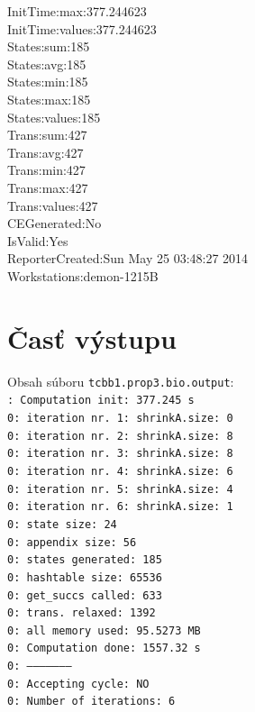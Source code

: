 \documentclass[11pt,final,oneside]{fithesis}
\begin{document}
{InitTime:max:377.244623\\
InitTime:values:377.244623\\
States:sum:185\\
States:avg:185\\
States:min:185\\
States:max:185\\
States:values:185\\
Trans:sum:427\\
Trans:avg:427\\
Trans:min:427\\
Trans:max:427\\
Trans:values:427\\
CEGenerated:No\\
IsValid:Yes\\
ReporterCreated:Sun May 25 03:48:27 2014\\
Workstations:demon-1215B\\
}


\section{\v Cas\v t v\'ystupu}
\label{sec:prop3output}
Obsah s\'uboru {\tt tcbb1.prop3.bio.output}:\\

{\tt{}: Computation init:  377.245 s\\
0: iteration nr. 1: shrinkA.size: 0\\
0: iteration nr. 2: shrinkA.size: 8\\
0: iteration nr. 3: shrinkA.size: 8\\
0: iteration nr. 4: shrinkA.size: 6\\
0: iteration nr. 5: shrinkA.size: 4\\
0: iteration nr. 6: shrinkA.size: 1\\
 0: state size:		24\\
 0: appendix size:	56\\
 0: states generated:	185\\
 0: hashtable size:	65536\\
 0: get\_succs called:	633\\
 0: trans. relaxed:	1392\\
 0: all memory used:	95.5273 MB\\
 0: Computation done:	1557.32 s\\
 0: --------------------\\
 0: Accepting cycle:	NO\\
 0: Number of iterations:	6\\
}
\end{document}
